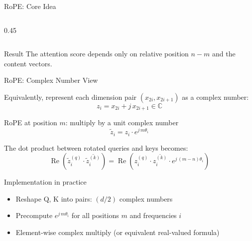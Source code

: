 \begin{frame}{RoPE: Core Idea~\cite{su2024roformer}}
\begin{columns}[T]
\begin{column}{0.45\textwidth}
\begin{center}
      \end{center}
    \end{column}
  \end{columns}

  \vspace{0.3em}
  \begin{block}{Result}
    The attention score depends only on relative position $n - m$ and the content vectors.
  \end{block}

\end{frame}

\begin{frame}{RoPE: Complex Number View}

  Equivalently, represent each dimension pair $(x_{2i}, x_{2i+1})$ as a complex number:
  \[
    z_i = x_{2i} + j\, x_{2i+1} \in \mathbb{C}
  \]

  RoPE at position $m$: multiply by a unit complex number
  \[
    \tilde{z}_i = z_i \cdot e^{j\, m \theta_i}
  \]

  \vspace{0.3em}
  The dot product between rotated queries and keys becomes:
  \[
    \operatorname{Re}\!\left(\tilde{z}_i^{(q)} \cdot \overline{\tilde{z}_i^{(k)}}\right) = \operatorname{Re}\!\left(z_i^{(q)} \cdot \overline{z_i^{(k)}} \cdot e^{j\,(m-n)\theta_i}\right)
  \]

  \vspace{0.3em}
  \begin{block}{Implementation in practice}
    \begin{itemize}
      \item Reshape Q, K into pairs: $(d/2)$ complex numbers
      \item Precompute $e^{j\, m \theta_i}$ for all positions $m$ and frequencies $i$
      \item Element-wise complex multiply (or equivalent real-valued formula)
    \end{itemize}
  \end{block}

\end{frame}

